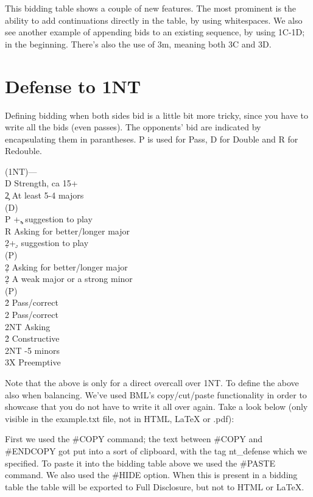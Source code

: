 \documentclass[a4paper]{article}
\begin{document}
This bidding table shows a couple of new features. The most
prominent is the ability to add continuations directly in the
table, by using whitespaces. We also see another example of
appending bids to an existing sequence, by using 1C-1D; in the
beginning. There's also the use of 3m, meaning both 3C and 3D.

\section{Defense to 1NT}

Defining bidding when both sides bid is a little bit more tricky,
since you have to write all the bids (even passes). The opponents'
bid are indicated by encapsulating them in parantheses. P is used
for Pass, D for Double and R for Redouble.

\begin{bidtable}
(1NT)---\\
D \> Strength, ca 15+\\
2\c \> At least 5-4 majors\+\\
(D)\+\\
P +\c, suggestion to play\\
R \> Asking for better/longer major\\
2\d {}+\d, suggestion to play\-\\
(P)\+\\
2\d \> Asking for better/longer major\-\-\\
2\d \> A weak major or a strong minor\+\\
(P)\+\\
2\h \> Pass/correct\\
2\s \> Pass/correct\\
2NT \> Asking\-\-\\
2\h\s \> Constructive\\
2NT -5 minors\\
3X \> Preemptive
\end{bidtable}

Note that the above is only for a direct overcall over 1NT. To
define the above also when balancing. We've used BML's
copy/cut/paste functionality in order to showcase that you do not
have to write it all over again. Take a look below (only visible in
the example.txt file, not in HTML, LaTeX or .pdf):

First we used the \#COPY command; the text between \#COPY and \#ENDCOPY
got put into a sort of clipboard, with the tag nt\_defense which we
specified. To paste it into the bidding table above we used
the \#PASTE command. We also used the \#HIDE option. When this is
present in a bidding table the table will be exported to Full
Disclosure, but not to HTML or LaTeX.
\end{document}
